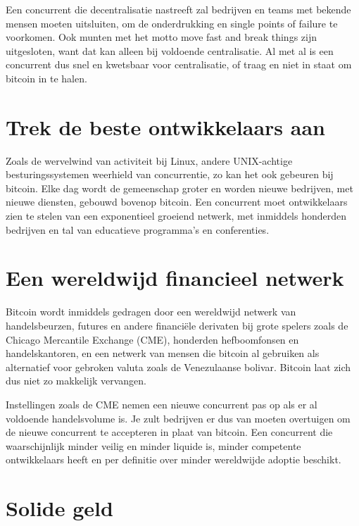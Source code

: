 \documentclass[
  letterpaper,
]{scrbook}
\begin{document}
Een concurrent die decentralisatie nastreeft zal bedrijven en teams met
bekende mensen moeten uitsluiten, om de onderdrukking en single points
of failure te voorkomen. Ook munten met het motto move fast and break
things zijn uitgesloten, want dat kan alleen bij voldoende
centralisatie. Al met al is een concurrent dus snel en kwetsbaar voor
centralisatie, of traag en niet in staat om bitcoin in te halen.

\hypertarget{trek-de-beste-ontwikkelaars-aan}{%
\section{Trek de beste ontwikkelaars
aan}\label{trek-de-beste-ontwikkelaars-aan}}

Zoals de wervelwind van activiteit bij Linux, andere UNIX-achtige
besturingssystemen weerhield van concurrentie, zo kan het ook gebeuren
bij bitcoin. Elke dag wordt de gemeenschap groter en worden nieuwe
bedrijven, met nieuwe diensten, gebouwd bovenop bitcoin. Een concurrent
moet ontwikkelaars zien te stelen van een exponentieel groeiend netwerk,
met inmiddels honderden bedrijven en tal van educatieve programma's en
conferenties.

\hypertarget{een-wereldwijd-financieel-netwerk}{%
\section{Een wereldwijd financieel
netwerk}\label{een-wereldwijd-financieel-netwerk}}

Bitcoin wordt inmiddels gedragen door een wereldwijd netwerk van
handelsbeurzen, futures en andere financiële derivaten bij grote spelers
zoals de Chicago Mercantile Exchange (CME), honderden hefboomfonsen en
handelskantoren, en een netwerk van mensen die bitcoin al gebruiken als
alternatief voor gebroken valuta zoals de Venezulaanse bolivar. Bitcoin
laat zich dus niet zo makkelijk vervangen.

Instellingen zoals de CME nemen een nieuwe concurrent pas op als er al
voldoende handelsvolume is. Je zult bedrijven er dus van moeten
overtuigen om de nieuwe concurrent te accepteren in plaat van bitcoin.
Een concurrent die waarschijnlijk minder veilig en minder liquide is,
minder competente ontwikkelaars heeft en per definitie over minder
wereldwijde adoptie beschikt.

\hypertarget{solide-geld}{%
\section{Solide geld}\label{solide-geld}}
\end{document}
